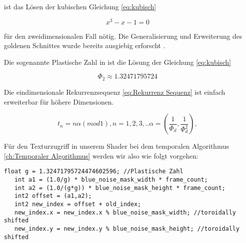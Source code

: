 ist das Lösen der kubischen Gleichung \ref{eq:kubisch}

\begin{tcolorbox}[rightrule=3mm, rounded corners=east]
    \begin{equation}\label{eq:kubisch}
        x^{3} - x - 1 = 0
    \end{equation}
\end{tcolorbox}

für den zweidimensionalen Fall nötig. Die Generalisierung und Erweiterung des goldenen 
Schnittes wurde bereits ausgiebig erforscht \cite{krcadinac2006new}.

Die sogenannte Plastische Zahl in ist die Lösung der
Gleichung \ref{eq:kubisch}

\begin{tcolorbox}[rightrule=3mm, rounded corners=east]
    \begin{equation}\label{eq:plastische Zahl}
        \Phi_{2} \approx 1.32471795724
    \end{equation}
\end{tcolorbox}

Die eindimensionale Rekurrenzsequenz \ref{eq:Rekurrenz Sequenz} ist einfach erweiterbar 
für höhere Dimensionen.
\begin{tcolorbox}[rightrule=3mm, rounded corners=east]
    \begin{equation}\label{eq:1 zu N - Dimensional}
        t_{n} = n\alpha(mod 1), n = 1,2,3,..
        \alpha = (\frac{1}{\Phi_{d}}, \frac{1}{\Phi_{d}^{2}}),
    \end{equation}
\end{tcolorbox}

Für den Texturzugriff in unserem Shader bei dem temporalen Algorithmus \ref{ch:Temporaler Algorithmus}
werden wir also wie folgt vorgehen:

\begin{lstlisting}[style=CStyle]
   float g = 1.32471795724474602596; //Plastische Zahl
   int a1 = (1.0/g) * blue_noise_mask_width * frame_count;
   int a2 = (1.0/(g*g)) * blue_noise_mask_height * frame_count;
   int2 offset = (a1,a2);
   int2 new_index = offset + old_index;
   new_index.x = new_index.x % blue_noise_mask_width; //toroidally shifted
   new_index.y = new_index.y % blue_noise_mask_height; //toroidally shifted
\end{lstlisting}
